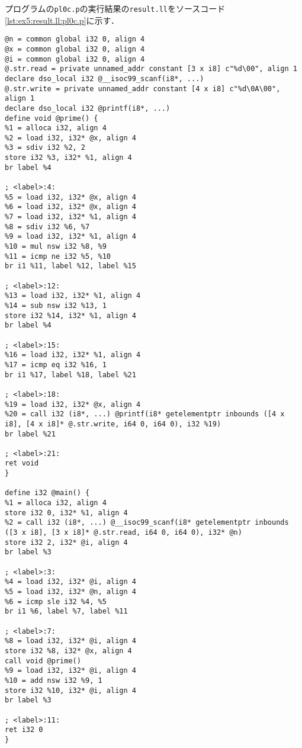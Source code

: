 \documentclass[uplatex]{jsarticle}
\begin{document}
プログラムの\verb#pl0c.p#の実行結果の\verb#result.ll#をソースコード\ref{lst:ex5:result.ll:pl0c.p}に示す．
\begin{lstlisting}[caption=condition句の処理,label=lst:ex5:result.ll:pl0c.p]
@n = common global i32 0, align 4
@x = common global i32 0, align 4
@i = common global i32 0, align 4
@.str.read = private unnamed_addr constant [3 x i8] c"%d\00", align 1
declare dso_local i32 @__isoc99_scanf(i8*, ...)
@.str.write = private unnamed_addr constant [4 x i8] c"%d\0A\00", align 1
declare dso_local i32 @printf(i8*, ...)
define void @prime() {
%1 = alloca i32, align 4
%2 = load i32, i32* @x, align 4
%3 = sdiv i32 %2, 2
store i32 %3, i32* %1, align 4
br label %4

; <label>:4:
%5 = load i32, i32* @x, align 4
%6 = load i32, i32* @x, align 4
%7 = load i32, i32* %1, align 4
%8 = sdiv i32 %6, %7
%9 = load i32, i32* %1, align 4
%10 = mul nsw i32 %8, %9
%11 = icmp ne i32 %5, %10
br i1 %11, label %12, label %15

; <label>:12:
%13 = load i32, i32* %1, align 4
%14 = sub nsw i32 %13, 1
store i32 %14, i32* %1, align 4
br label %4

; <label>:15:
%16 = load i32, i32* %1, align 4
%17 = icmp eq i32 %16, 1
br i1 %17, label %18, label %21

; <label>:18:
%19 = load i32, i32* @x, align 4
%20 = call i32 (i8*, ...) @printf(i8* getelementptr inbounds ([4 x i8], [4 x i8]* @.str.write, i64 0, i64 0), i32 %19)
br label %21

; <label>:21:
ret void
}

define i32 @main() {
%1 = alloca i32, align 4
store i32 0, i32* %1, align 4
%2 = call i32 (i8*, ...) @__isoc99_scanf(i8* getelementptr inbounds ([3 x i8], [3 x i8]* @.str.read, i64 0, i64 0), i32* @n)
store i32 2, i32* @i, align 4
br label %3

; <label>:3:
%4 = load i32, i32* @i, align 4
%5 = load i32, i32* @n, align 4
%6 = icmp sle i32 %4, %5
br i1 %6, label %7, label %11

; <label>:7:
%8 = load i32, i32* @i, align 4
store i32 %8, i32* @x, align 4
call void @prime()
%9 = load i32, i32* @i, align 4
%10 = add nsw i32 %9, 1
store i32 %10, i32* @i, align 4
br label %3

; <label>:11:
ret i32 0
}
\end{lstlisting}
\end{document}
